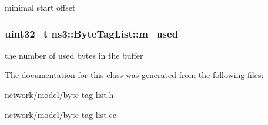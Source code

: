 minimal start offset 

\subsubsection[{\texorpdfstring{m\+\_\+used}{m_used}}]{\setlength{\rightskip}{0pt plus 5cm}uint32\+\_\+t ns3\+::\+Byte\+Tag\+List\+::m\+\_\+used\hspace{0.3cm}{\ttfamily [private]}}\hypertarget{classns3_1_1ByteTagList_a2b9da16dd6ed8ba23f4c604834a48faf}{}\label{classns3_1_1ByteTagList_a2b9da16dd6ed8ba23f4c604834a48faf}


the number of used bytes in the buffer 



The documentation for this class was generated from the following files\+:\begin{DoxyCompactItemize}
\item 
network/model/\hyperlink{byte-tag-list_8h}{byte-\/tag-\/list.\+h}\item 
network/model/\hyperlink{byte-tag-list_8cc}{byte-\/tag-\/list.\+cc}\end{DoxyCompactItemize}
